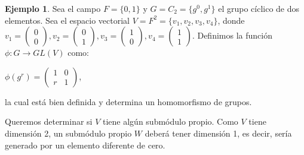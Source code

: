 \documentclass[12pt]{book}
\theoremstyle{definition}
\newtheorem{example}[theorem]{Ejemplo}
\newcounter{in}
\newcounter{ini}
\begin{document}
\begin{example}
  \label{ej-no-reducibilidad}
  Sea el campo $F=\{0,1\}$ y $G=C_{2}=\{g^{0},g^{1}\}$ el grupo
  cíclico de dos elementos. Sea el espacio vectorial
  $V=F^{2}=\{v_{1},v_{2},v_{3},v_{4}\}$, donde  
  $v_{1}=
  \begin{pmatrix}
    0\\
    0  
  \end{pmatrix},
  v_{2}=
  \begin{pmatrix}
    0\\
    1  
  \end{pmatrix},
  v_{3}=
  \begin{pmatrix}
    1\\
    0  
  \end{pmatrix},
  v_{4}=
  \begin{pmatrix}
    1\\
    1  
  \end{pmatrix}.
  $
  Definimos la función $\phi:G\rightarrow GL(V)$ como:
  \begin{center}
    $\phi(g^{r})=
    \begin{pmatrix}
      1 & 0 \\
      r & 1 
    \end{pmatrix}$,
  \end{center}
  la cual está bien definida y determina un homomorfismo de grupos.

Queremos determinar si $V$ tiene algún submódulo propio. Como $V$
tiene dimensión 2, un submódulo propio $W$ deberá tener dimensión 1,
es decir, sería generado por un elemento diferente de cero.



\end{example}
\end{document}
